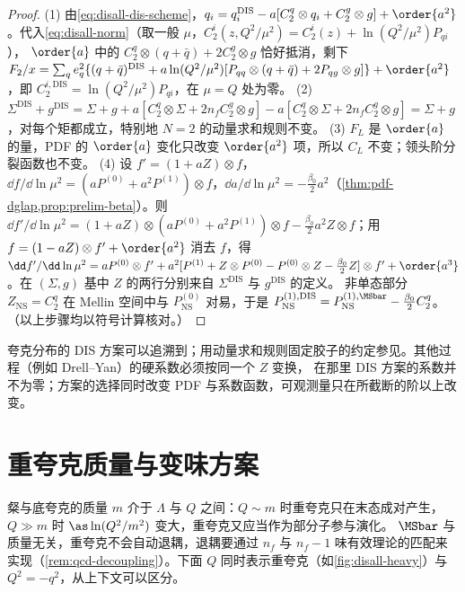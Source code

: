 \begin{proof}
(1) 由\cref{eq:disall-dis-scheme}，$q_i=q_i^{\mathrm{DIS}}-a[C_2^q\otimes q_i+C_2^g\otimes g]+\order{a^2}$。代入\cref{eq:disall-norm}（取一般 $\mu$，$C_2^i(z,Q^2/\mu^2)=C_2^i(z)+\ln(Q^2/\mu^2)P_{qi}$），
$\order{a}$ 中的 $C_2^q\otimes(q+\bar q)+2C_2^g\otimes g$ 恰好抵消，剩下
$F_2/x=\sum_qe_q^2\{(q+\bar q)^{\mathrm{DIS}}+a\ln(Q^2/\mu^2)[P_{qq}\otimes(q+\bar q)+2P_{qg}\otimes g]\}+\order{a^2}$，即 $C_2^{i,\mathrm{DIS}}=\ln(Q^2/\mu^2)P_{qi}$，在 $\mu=Q$ 处为零。
(2) $\Sigma^{\mathrm{DIS}}+g^{\mathrm{DIS}}=\Sigma+g+a[C_2^q\otimes\Sigma+2n_fC_2^g\otimes g]-a[C_2^q\otimes\Sigma+2n_fC_2^g\otimes g]=\Sigma+g$，对每个矩都成立，特别地 $N=2$ 的动量求和规则不变。
(3) $F_L$ 是 $\order{a}$ 的量，PDF 的 $\order{a}$ 变化只改变 $\order{a^2}$ 项，所以 $C_L$ 不变；领头阶分裂函数也不变。
(4) 设 $f'=(1+aZ)\otimes f$，$\dd f/\dd\ln\mu^2=(aP^{(0)}+a^2P^{(1)})\otimes f$，$\dd a/\dd\ln\mu^2=-\frac{\beta_0}2a^2$（\cref{thm:pdf-dglap,prop:prelim-beta}）。则
$\dd f'/\dd\ln\mu^2=(1+aZ)\otimes(aP^{(0)}+a^2P^{(1)})\otimes f-\frac{\beta_0}2a^2Z\otimes f$；用 $f=(1-aZ)\otimes f'+\order{a^2}$ 消去 $f$，得
$\dd f'/\dd\ln\mu^2=aP^{(0)}\otimes f'+a^2[P^{(1)}+Z\otimes P^{(0)}-P^{(0)}\otimes Z-\frac{\beta_0}2Z]\otimes f'+\order{a^3}$。在 $(\Sigma,g)$ 基中 $Z$ 的两行分别来自 $\Sigma^{\mathrm{DIS}}$ 与 $g^{\mathrm{DIS}}$ 的定义。
非单态部分 $Z_{\mathrm{NS}}=C_2^q$ 在 Mellin 空间中与 $P^{(0)}_{\mathrm{NS}}$ 对易，于是 $P^{(1),\mathrm{DIS}}_{\mathrm{NS}}=P^{(1),\MSbar}_{\mathrm{NS}}-\frac{\beta_0}2C_2^q$。
（以上步骤均以符号计算核对。）
\end{proof}

\noindent
夸克分布的 DIS 方案可以追溯到\cite{AltarelliEllisMartinelli1979}；用动量求和规则固定胶子的约定参见\cite{DiemozEtAl1988}。其他过程（例如 Drell--Yan）的硬系数必须按同一个 $Z$ 变换，
在那里 DIS 方案的系数并不为零；方案的选择同时改变 PDF 与系数函数，可观测量只在所截断的阶以上改变。
\section{重夸克质量与变味方案}\label{sec:disall-heavy}

粲与底夸克的质量 $m$ 介于 $\Lambda$ 与 $Q$ 之间：$Q\sim m$ 时重夸克只在末态成对产生，$Q\gg m$ 时 $\as\ln(Q^2/m^2)$ 变大，重夸克又应当作为部分子参与演化。
$\MSbar$ 与质量无关，重夸克不会自动退耦，退耦要通过 $n_f$ 与 $n_f-1$ 味有效理论的匹配来实现（\cref{rem:qcd-decoupling}）。下面 $Q$ 同时表示重夸克（如\cref{fig:disall-heavy}）与 $Q^2=-q^2$，从上下文可以区分。

